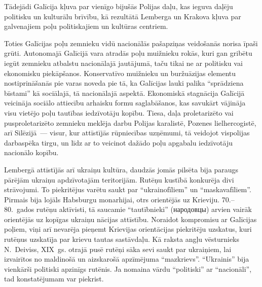 \documentclass[twoside,a5paper,12pt,fleqn,openany]{extbook}
\newcommand{\rutxti}[1]{\textrussian{#1}}
\begin{document}
Tādejādi Galīcija kļuva par vienīgo bijušās Polijas daļu, kas ieguva daļēju politisku un kulturālu brīvību, kā rezultātā Lemberga un Krakova kļuva par galvenajiem poļu politiskajiem un kultūras centriem.

Toties Galīcijas poļu zemnieku vidū nacionālās pašapziņas veidošanās norisa īpaši grūti. Autonomajā Galīcijā vara atradās poļu muižnieku rokās, kuri gan gribētu iegūt zemnieku atbalstu nacionālajā jautājumā, taču tikai ne ar politisku vai ekonomisku piekāpšanos. Konservatīvo muižnieku un buržuāzijas elementu nostiprināšanās pie varas noveda pie tā, ka Galīcijas lauki palika ``sprādziena bīstami'' kā sociālajā, tā nacionālajā aspektā. Ekonomiskā stagnācija Galīcijā veicināja sociālo attiecību arhaisku formu saglabāšanos, kas savukārt vājināja visu vietējo poļu tautības iedzīvotāju kopību. Tiesa, daļa proletarizēto vai pusproletarizēto zemnieku meklēja darbu Polijas karalistē, Pozenes lielhercogistē, arī Silēzijā~--- visur, kur attīstījās rūpniecības uzņēmumi, tā veidojot vispolijas darbaspēka tirgu, un līdz ar to veicinot dažādo poļu apgabalu iedzīvotāju nacionālo kopību.

Lembergā attīstījās arī ukraiņu kultūra, daudzās jomās pilsēta bija paraugs pārējām ukraiņu apdzīvotajām teritorijām. Rutēņu kustībā konkurēja divi strāvojumi. To piekritējus varētu saukt par ``ukrainofīliem'' un ``maskavafīliem''. Pirmais bija lojāls Habsburgu monarhijai, otrs orientējās uz Krieviju. 70.--80.~gados rutēņu aktīvisti, tā saucamie ``tautībnieki'' (\rutxti{народовцы}) arvien vairāk orientējās uz kopīgas ukraiņu nācijas attīstību. Noraidot kompromisu ar Galīcijas poļiem, viņi arī nevarēja pieņemt Krievijas orientācijas piekritēju uzskatus, kuri rutēņus uzskatīja par krievu tautas sastāvdaļu. Kā raksta angļu vēsturnieks N.~Deiviss, XIX~gs. otrajā pusē rutēņi sāka sevi saukt par ukraiņiem, lai izvairītos no maldinošā un aizskarošā apzīmējuma ``mazkrievs''. ``Ukrainis'' bija vienkārši politiski apzinīgs rutēnis. Ja nomaina vārdu ``politiski'' ar ``nacionāli'', tad konstatējumam var piekrist.
\end{document}
